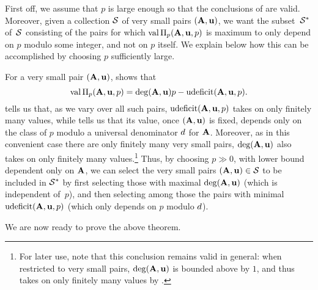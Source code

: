 \documentclass{amsart}
\begin{document}
\begin{remark}
   \label{p large m-primary: R} 
   First off, we assume that $p$ is large enough so that the conclusions of  are valid.
   Moreover, given a collection $\S$ of very small pairs $(\matA,\vv{u})$, we want the subset~$\S^*$ of~$\S$ consisting of the pairs for which $\val \IP_p(\matA,\vv{u},p)$ is maximum to only depend on $p$ modulo some integer, and not on $p$ itself.
   We explain below how this can be accomplished by choosing $p$ sufficiently large.

   For a very small pair $(\matA,\vv{u})$,  shows that
   \[ \val \IP_p(\matA,\vv{u},p) = \degree(\matA,\vv{u})p-\udeficit(\matA,\vv{u},p).\]
    tells us that, as we vary over all such pairs, $\udeficit(\matA,\vv{u},p)$ takes on only finitely many values, while  tells us that its value, once $(\matA,\vv{u})$ is fixed, depends only on the class of $p$ modulo a universal denominator $\denom$ for $\matA$.
   Moreover, as in this convenient case there are only finitely many very small pairs, $\degree(\matA,\vv{u})$ also takes on only finitely many values.\footnote{For later use, note that this conclusion remains valid in general: when restricted to very small pairs, $\degree(\matA,\vv{u})$ is bounded above by $1$, and thus takes on only finitely many values by .}
   Thus, by choosing $p\gg 0$, with lower bound dependent only on $\matA$, we can select the very small pairs $(\matA,\vv{u}) \in \S$ to be included in $\S^*$ by first selecting those with maximal $\degree(\matA,\vv{u})$ (which is independent of~$p$), and then selecting among those the pairs with minimal $\udeficit(\matA,\vv{u},p)$ (which only depends on $p$ modulo $\denom$).
\end{remark}

We are now ready to prove the above theorem.
\end{document}
